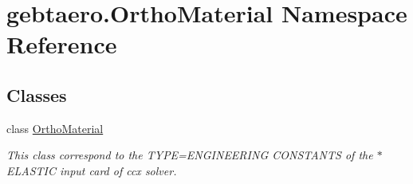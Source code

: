\hypertarget{namespacegebtaero_1_1_ortho_material}{}\section{gebtaero.\+Ortho\+Material Namespace Reference}
\label{namespacegebtaero_1_1_ortho_material}
\subsection*{Classes}
\begin{DoxyCompactItemize}
\item 
class \hyperlink{classgebtaero_1_1_ortho_material_1_1_ortho_material}{Ortho\+Material}
\begin{DoxyCompactList}\small\item\em This class correspond to the T\+Y\+PE=E\+N\+G\+I\+N\+E\+E\+R\+I\+NG C\+O\+N\+S\+T\+A\+N\+TS of the $\ast$\+E\+L\+A\+S\+T\+IC input card of ccx solver. \end{DoxyCompactList}\end{DoxyCompactItemize}
